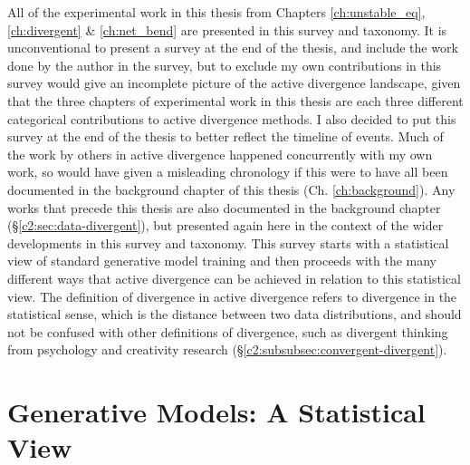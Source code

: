 All of the experimental work in this thesis from Chapters \ref{ch:unstable_eq}, \ref{ch:divergent} \& \ref{ch:net_bend} are presented in this survey and taxonomy.
It is unconventional to present a survey at the end of the thesis, and include the work done by the author in the survey, but to exclude my own contributions in this survey would give an incomplete picture of the active divergence landscape, given that the three chapters of experimental work in this thesis are each three different categorical contributions to active divergence methods.
I also decided to put this survey at the end of the thesis to better reflect the timeline of events.
Much of the work by others in active divergence happened concurrently with my own work, so would have given a misleading chronology if this were to have all been documented in the background chapter of this thesis (Ch. \ref{ch:background}). 
Any works that precede this thesis are also documented in the background chapter (\S \ref{c2:sec:data-divergent}), but presented again here in the context of the wider developments in this survey and taxonomy. 
This survey starts with a statistical view of standard generative model training and then proceeds with the many different ways that active divergence can be achieved in relation to this statistical view.
The definition of divergence in active divergence refers to divergence in the statistical sense, which is the distance between two data distributions, and should not be confused with other definitions of divergence, such as divergent thinking from psychology and creativity research \citep{guilford1957creative} (\S \ref{c2:subsubsec:convergent-divergent}).

\section{Generative Models: A Statistical View}

